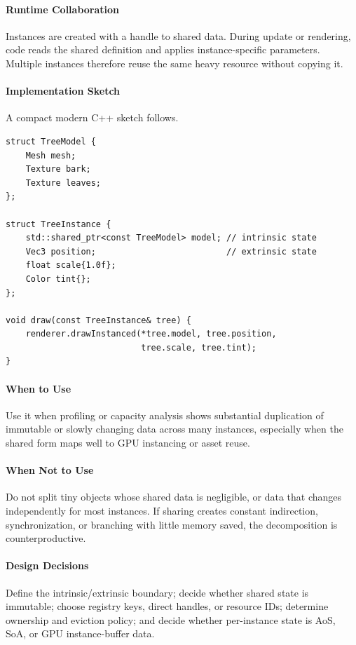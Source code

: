 \documentclass[11pt]{article}
\begin{document}
\paragraph{Runtime Collaboration} Instances are created with a handle to shared data. During update or rendering, code reads the shared definition and applies instance-specific parameters. Multiple instances therefore reuse the same heavy resource without copying it.
\paragraph{Implementation Sketch} A compact modern C++ sketch follows.
\begin{lstlisting}
struct TreeModel {
    Mesh mesh;
    Texture bark;
    Texture leaves;
};

struct TreeInstance {
    std::shared_ptr<const TreeModel> model; // intrinsic state
    Vec3 position;                          // extrinsic state
    float scale{1.0f};
    Color tint{};
};

void draw(const TreeInstance& tree) {
    renderer.drawInstanced(*tree.model, tree.position,
                           tree.scale, tree.tint);
}
\end{lstlisting}
\paragraph{When to Use} Use it when profiling or capacity analysis shows substantial duplication of immutable or slowly changing data across many instances, especially when the shared form maps well to GPU instancing or asset reuse.
\paragraph{When Not to Use} Do not split tiny objects whose shared data is negligible, or data that changes independently for most instances. If sharing creates constant indirection, synchronization, or branching with little memory saved, the decomposition is counterproductive.
\paragraph{Design Decisions} Define the intrinsic/extrinsic boundary; decide whether shared state is immutable; choose registry keys, direct handles, or resource IDs; determine ownership and eviction policy; and decide whether per-instance state is AoS, SoA, or GPU instance-buffer data.
\end{document}

